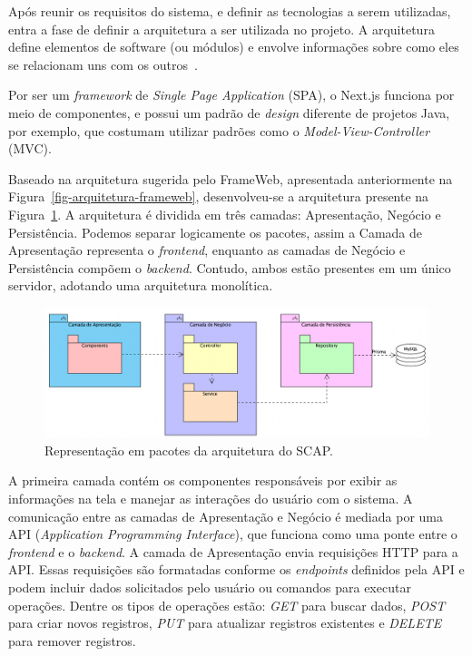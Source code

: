 Após reunir os requisitos do sistema, e definir as tecnologias a serem utilizadas, entra a fase 
de definir a arquitetura a ser utilizada no projeto. A arquitetura define elementos
de software (ou módulos) e envolve informações sobre como eles se relacionam uns com os outros~\cite{falbo:2018}.

Por ser um \textit{framework} de \textit{Single Page Application} (SPA), o Next.js funciona por meio de componentes,
e possui um padrão de \textit{design} diferente de projetos Java, por exemplo, que costumam utilizar
padrões como o \textit{Model-View-Controller} (MVC). 

Baseado na arquitetura sugerida pelo FrameWeb, apresentada anteriormente na Figura~\ref{fig-arquitetura-frameweb}, 
desenvolveu-se a arquitetura presente na Figura~\ref{fig-arquitetura}.
A arquitetura é dividida em três camadas: Apresentação, Negócio e Persistência.
Podemos separar logicamente os pacotes, assim a Camada de Apresentação representa o \textit{frontend}, enquanto as
camadas de Negócio e Persistência compõem o \textit{backend}. Contudo, ambos estão
presentes em um único servidor, adotando uma arquitetura monolítica.

\begin{figure}[h!]
	\centering
	\includegraphics[width=\textwidth]{figuras/fig-arquitetura.png}
	\caption{Representação em pacotes da arquitetura do SCAP.}
	\label{fig-arquitetura}
\end{figure}

A primeira camada contém os componentes responsáveis por exibir as informações na tela e manejar as interações do usuário
com o sistema. A comunicação entre as camadas de Apresentação e Negócio é mediada por uma API
(\textit{Application Programming Interface}), que funciona como uma ponte entre o
\textit{frontend} e o \textit{backend}. A camada de Apresentação envia requisições HTTP para a API.
Essas requisições são formatadas conforme os \textit{endpoints} definidos pela API
e podem incluir dados solicitados pelo usuário ou comandos para executar operações.
Dentre os tipos de operações estão: \textit{GET} para buscar dados, \textit{POST} para criar novos registros,
\textit{PUT} para atualizar registros existentes e \textit{DELETE} para remover registros.

